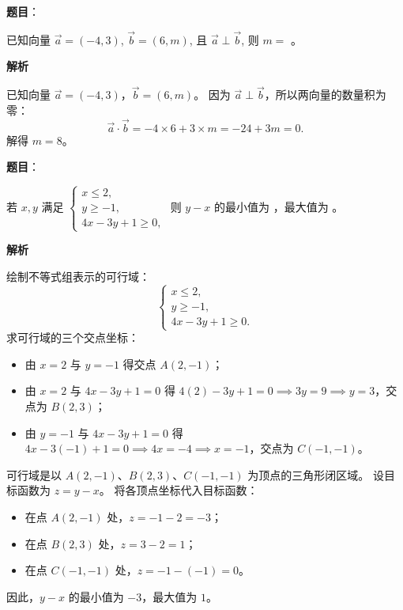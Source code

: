 \begin{answer}

\textbf{题目}：

已知向量 $\vec{a} = (-4, 3)$, $\vec{b} = (6, m)$, 且 $\vec{a} \perp \vec{b}$, 则 $m =$ \gkblank{}。

\textbf{解析}

已知向量 $\vec{a} = (-4, 3)$，$\vec{b} = (6, m)$。
因为 $\vec{a} \perp \vec{b}$，所以两向量的数量积为零：
\nopagebreak[4]
\[\vec{a} \cdot \vec{b} = -4 \times 6 + 3 \times m = -24 + 3m = 0.\]
解得 $m = 8$。


\end{answer}
\begin{answer}

\textbf{题目}：

若 $x, y$ 满足 $\begin{cases} x \leqslant 2, \\ y \geqslant -1, \\ 4x - 3y + 1 \geqslant 0, \end{cases}$ 则 $y - x$ 的最小值为 \gkblank{}，最大值为 \gkblank{}。

\textbf{解析}

绘制不等式组表示的可行域：
\nopagebreak[4]
\[\begin{cases} x \leqslant 2, \\ y \geqslant -1, \\ 4x - 3y + 1 \geqslant 0. \end{cases}\]
求可行域的三个交点坐标：
\begin{itemize}
\item 由 $x = 2$ 与 $y = -1$ 得交点 $A(2, -1)$；
\item 由 $x = 2$ 与 $4x - 3y + 1 = 0$ 得 $4(2) - 3y + 1 = 0 \implies 3y = 9 \implies y = 3$，交点为 $B(2, 3)$；
\item 由 $y = -1$ 与 $4x - 3y + 1 = 0$ 得 $4x - 3(-1) + 1 = 0 \implies 4x = -4 \implies x = -1$，交点为 $C(-1, -1)$。
\end{itemize}
可行域是以 $A(2, -1)$、$B(2, 3)$、$C(-1, -1)$ 为顶点的三角形闭区域。
设目标函数为 $z = y - x$。
将各顶点坐标代入目标函数：
\begin{itemize}
\item 在点 $A(2, -1)$ 处，$z = -1 - 2 = -3$；
\item 在点 $B(2, 3)$ 处，$z = 3 - 2 = 1$；
\item 在点 $C(-1, -1)$ 处，$z = -1 - (-1) = 0$。
\end{itemize}
因此，$y - x$ 的最小值为 $-3$，最大值为 $1$。


\end{answer}
